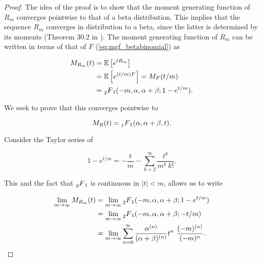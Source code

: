 \documentclass[american, abstract=on]{scrartcl}
\theoremstyle{plain}
\newcommand{\E}{\mathbb{E}}
\newcommand{\abs}[1]{\left\lvert#1\right\rvert}
\begin{document}
\begin{proof}

    The idea of the proof is to show that the moment generating function of $R_m$ converges pointwise to that of a beta distribution. This implies that the sequence $R_m$ converges in distribution to a beta, since the latter is determined by its moments (Theorem 30.2 in \cite{billingsley_probability_1995}). The moment generating function of $R_m$ can be written in terms of that of $F$ (\ref{eq:mgf_betabinomial}) as 

    \begin{equation} \label{eq:mgf_rm}
        \begin{split}
            M_{R_m}(t) &= \E\left[e^{t R_m}\right] \\ 
            &= \E\left[e^{(t / m) F}\right] = M_F(t / m) \\
            &= \prescript{}{2}{F}_1(-m, \alpha, \alpha + \beta; 1 - e^{t / m}). 
        \end{split}
    \end{equation}

    We seek to prove that this converges pointwise to 

    \begin{equation}
        M_R(t) = \prescript{}{1}{F}_1(\alpha, \alpha + \beta, t).
    \end{equation}

    Consider the Taylor series of 

    \begin{equation}
        1 - e^{t / m} = -\frac{t}{m} - \sum^{\infty}_{k = 2} \frac{t^k}{m^k \ k!}.
    \end{equation}

    This and the fact that $\prescript{}{2}{F}_1$ is continuous in $\abs{t} < m$, allows us to write

    \begin{equation}
        \begin{split}
            \lim_{m \rightarrow \infty} M_{R_m}(t) &= \lim_{m \rightarrow \infty} \prescript{}{2}{F}_1(-m, \alpha, \alpha + \beta; 1 - e^{t / m})\\
            &= \lim_{m \rightarrow \infty} \prescript{}{2}{F}_1(-m, \alpha, \alpha + \beta; - t/ m) \\
            &= \lim_{m \rightarrow \infty}\sum^{\infty}_{n=0} \frac{\alpha^{(n)}}{(\alpha + \beta)^{(n)}} t^n \  \frac{(-m)^{(n)}}{(-m)^n}.
        \end{split}
    \end{equation}


\end{proof}
\end{document}
